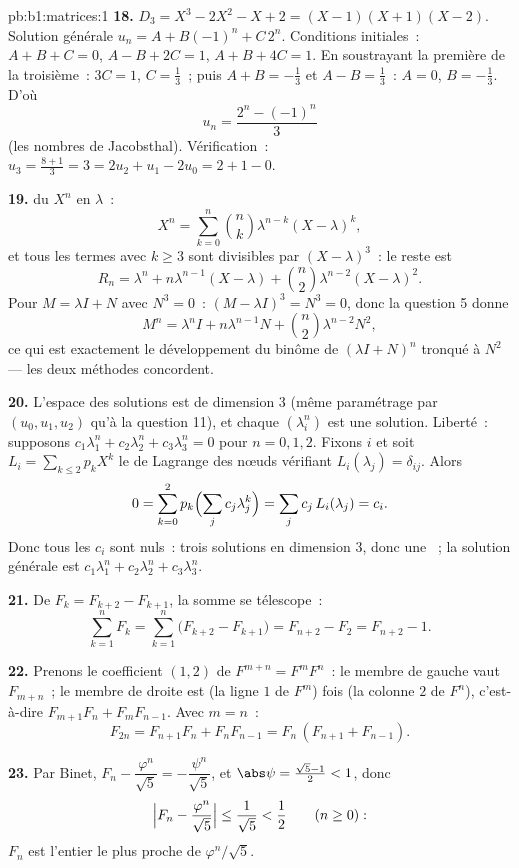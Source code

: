 \begin{solution}{pb:b1:matrices:1}
\textbf{18.} $D_3 = X^3 - 2X^2 - X + 2 = (X-1)(X+1)(X-2)$.
Solution générale $u_n = A + B(-1)^n + C\,2^n$. Conditions
initiales~: $A + B + C = 0$, $A - B + 2C = 1$, $A + B + 4C = 1$.
En soustrayant la première de la troisième~: $3C = 1$, $C = \frac13$~;
puis $A + B = -\frac13$ et $A - B = \frac13$~: $A = 0$, $B =
-\frac13$. D'où
\[
u_n = \frac{2^n - (-1)^n}{3}
\]
(les nombres de Jacobsthal). Vérification~: $u_3 = \frac{8 + 1}{3} = 3 =
2u_2 + u_1 - 2u_0 = 2 + 1 - 0$.

\textbf{19.}  du  $X^n$ en
$\lambda$~:
\[
X^n = \sum_{k=0}^{n} \binom nk \lambda^{n-k}(X - \lambda)^k ,
\]
et tous les termes avec $k \geq 3$ sont divisibles par $(X -
\lambda)^3$~: le reste est
\[
R_n = \lambda^n + n\lambda^{n-1}(X - \lambda) + \binom
n2\lambda^{n-2}(X - \lambda)^2 .
\]
Pour $M = \lambda I + N$ avec $N^3 = 0$~: $(M - \lambda I)^3 = N^3
= 0$, donc la question 5 donne
\[
M^n = \lambda^n I + n\lambda^{n-1} N + \binom n2
\lambda^{n-2} N^2 ,
\]
ce qui est exactement le développement du binôme de $(\lambda I + N)^n$
tronqué à $N^2$ --- les deux méthodes concordent.

\textbf{20.} L'espace des solutions est de dimension $3$ (même
paramétrage par $(u_0, u_1, u_2)$ qu'à la question 11), et
chaque $(\lambda_i^n)$ est une solution. Liberté~: supposons
$c_1\lambda_1^n + c_2\lambda_2^n + c_3\lambda_3^n = 0$ pour $n =
0, 1, 2$. Fixons $i$ et soit $L_i = \sum_{k \leq 2} p_k X^k$ le
 de Lagrange des nœuds vérifiant $L_i(\lambda_j) =
\delta_{ij}$. Alors
\[
0 = \sum_{k=0}^{2} p_k\Bigl(\sum_j c_j\lambda_j^k\Bigr)
= \sum_j c_j\,L_i(\lambda_j) = c_i .
\]
Donc tous les $c_i$ sont nuls~: trois solutions  en dimension
$3$, donc une ~; la solution générale est $c_1\lambda_1^n +
c_2\lambda_2^n + c_3\lambda_3^n$.

\textbf{21.} De $F_k = F_{k+2} - F_{k+1}$, la somme se télescope~:
\[
\sum_{k=1}^{n} F_k = \sum_{k=1}^{n}\bigl(F_{k+2} - F_{k+1}\bigr)
= F_{n+2} - F_2 = F_{n+2} - 1 .
\]

\textbf{22.} Prenons le coefficient $(1,2)$ de $F^{m+n} = F^m F^n$~: le
membre de gauche vaut $F_{m+n}$~; le membre de droite est (la ligne $1$
de $F^m$) fois (la colonne $2$ de $F^n$), c'est-à-dire $F_{m+1}F_n +
F_m F_{n-1}$. Avec $m = n$~:
\[
F_{2n} = F_{n+1}F_n + F_nF_{n-1} = F_n\,(F_{n+1} + F_{n-1}).
\]

\textbf{23.} Par Binet, $F_n - \dfrac{\varphi^n}{\sqrt5} =
-\dfrac{\psi^n}{\sqrt5}$, et $\abs\psi = \frac{\sqrt5 - 1}2 <
1$, donc
\[
\Bigl|F_n - \frac{\varphi^n}{\sqrt5}\Bigr|
\leq \frac{1}{\sqrt5} < \frac12
\qquad (n \geq 0):
\]
$F_n$ est l'entier le plus proche de $\varphi^n/\sqrt5$.


\end{solution}
